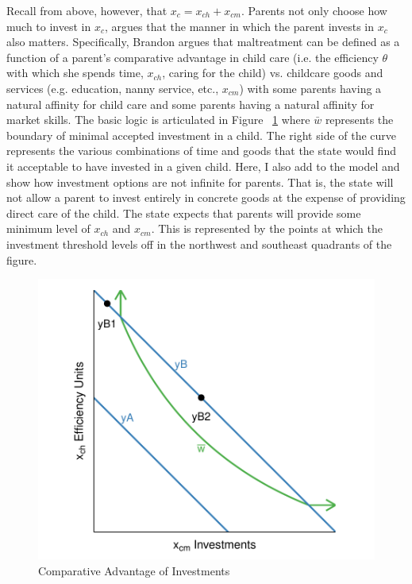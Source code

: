 \documentclass[1p, review]{elsarticle}\usepackage[]{graphicx}\usepackage[]{color}
\makeatletter
\def\maxwidth{ %
  \ifdim\Gin@nat@width>\linewidth
    \linewidth
  \else
    \Gin@nat@width
  \fi
}
\newenvironment{knitrout}{}{} %
\makeatother
\begin{document}
Recall from above, however, that $x_c=x_{ch}+x_{cm}$. Parents not only choose how much to invest in $x_c$, \citet{Brandon2001} argues that the manner in which the parent invests in $x_c$ also matters. Specifically, Brandon argues that maltreatment can be defined as a function of a parent's comparative advantage in child care (i.e. the efficiency $\theta$ with which she spends time, $x_{ch}$, caring for the child) vs. childcare goods and services (e.g. education, nanny service, etc., $x_{cm}$) with some parents having a natural affinity for child care and some parents having a natural affinity for market skills. The basic logic is articulated in Figure ~\ref{fig:plot3} where $\bar{w}$ represents the boundary of minimal accepted investment in a child. The right side of the curve represents the various combinations of time and goods that the state would find it acceptable to have invested in a given child. Here, I also add to the \citet{Brandon2001} model and show how investment options are not infinite for parents. That is, the state will not allow a parent to invest entirely in concrete goods at the expense of providing direct care of the child. The state expects that parents will provide some minimum level of $x_{ch}$ and $x_{cm}$. This is represented by the points at which the investment threshold levels off in the northwest and southeast quadrants of the figure. 

\begin{figure}
\begin{knitrout}\small
{}\color{fgcolor}

{\centering \includegraphics[width=\maxwidth]{figure/Figure4} 

}



\end{knitrout}

\caption{Comparative Advantage of Investments}\label{fig:plot3}
\end{figure}
\end{document}
